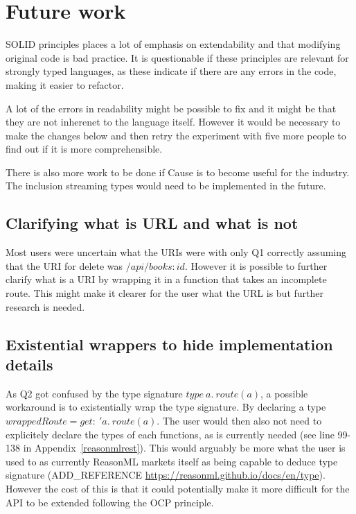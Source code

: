 \section{Future work}\label{futurework}

SOLID principles places a lot of emphasis on extendability and that modifying
original code is bad practice. It is questionable if these principles are
relevant for strongly typed languages, as these indicate if there are any
errors in the code, making it easier to refactor.

A lot of the errors in readability might be possible to fix and it might be
that they are not inherenet to the language itself. However it would be
necessary to make the changes below and then retry the experiment with five 
more people to find out if it is more comprehensible. 

There is also more work to be done if Cause is to become useful for the
industry. The inclusion streaming types would need to be implemented in the
future.

\subsection{Clarifying what is URL and what is not}

Most users were uncertain what the URIs were with only Q1 correctly assuming
that the URI for delete was $/api/books:id$. However it is possible to further
clarify what is a URI by wrapping it in a function that takes an incomplete
route. This might make it clearer for the user what the URL is but further
research is needed.

\subsection{Existential wrappers to hide implementation details}

As Q2 got confused by the type signature $type\ a.\ route(a)$, a possible
workaround is to existentially wrap the type signature.  By declaring a type
$wrappedRoute = {get :\ 'a.\ route(a)}$. The user would then also not need to
explicitely declare the types of each functions, as is currently needed (see
line 99-138 in Appendix~\ref{reasonmlrest}). This would arguably be more what
the user is used to as currently ReasonML markets itself as being capable to
deduce type signature (ADD\_REFERENCE
\url{https://reasonml.github.io/docs/en/type}). However the cost of this is
that it could potentially make it more difficult for the API to be extended
following the OCP principle. 

